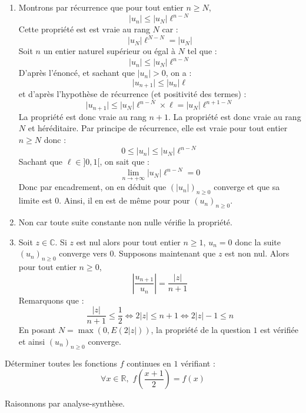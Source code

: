 \documentclass[a4paper,10pt]{report}
\begin{document}
\corr 

\begin{enumerate}
\item Montrons par récurrence que pour tout entier $n \geq N$,
$$ \vert u_n \vert  \leq \vert u_N \vert  \ell^{n-N}$$
Cette propriété est est vraie au rang $N$ car :
$$ \vert u_N \vert \ell^{N-N} = \vert u_N \vert $$
Soit $n$ un entier naturel supérieur ou égal à $N$ tel que :
$$  \vert u_n \vert \leq \vert u_N \vert \ell^{n-N}$$
D'après l'énoncé, et sachant que $\vert u_n \vert >0$, on a :
$$ \vert u_{n+1} \vert \leq \vert u_n \vert \ell$$
et d'après l'hypothèse de récurrence (et positivité des termes) : 
$$  \vert u_{n+1} \vert \leq \vert u_N \vert \ell^{n-N} \times \ell = \vert u_N \vert \ell^{n+1-N}$$
La propriété est donc vraie au rang $n+1$. La propriété est donc vraie au rang $N$ et héréditaire. Par principe de récurrence, elle est vraie pour tout entier $n \geq N$ donc :
$$ 0 \leq \vert u_n \vert \leq  \vert u_N \vert  \ell^{n-N}$$
Sachant que $\ell \in ]0,1[$, on sait que :
$$ \lim_{n \rightarrow + \infty} \vert u_N \vert  \ell^{n-N} = 0$$
Donc par encadrement, on en déduit que $(\vert u_n \vert)_{n \geq 0}$ converge et que sa limite est $0$. Ainsi, il en est de même pour pour $(u_n)_{n \geq 0}$.
\item Non car toute suite constante non nulle vérifie la propriété.
\item Soit $z \in \mathbb{C}$. Si $z$ est nul alors pour tout entier $n \geq 1$, $u_n=0$ donc la suite $(u_n)_{n \geq 0}$ converge vers $0$. Supposons maintenant que $z$ est non nul. Alors pour tout entier $n \geq 0$,
$$ \left\vert \dfrac{u_{n+1}}{u_n} \right\vert =\dfrac{\vert z \vert}{n+1}$$
Remarquons que :
$$ \dfrac{\vert z \vert}{n+1} \leq \dfrac{1}{2} \Longleftrightarrow  2 \vert z \vert \leq n+1 \Longleftrightarrow 2 \vert z \vert - 1 \leq n$$
En posant $N = \max(0, E(2 \vert z\vert))$, la propriété de la question $1$ est vérifiée et ainsi $(u_n)_{n \geq 0}$ converge.
\end{enumerate}

\medskip

\begin{Exa} Déterminer toutes les fonctions $f$ continues en $1$ vérifiant :
$$ \forall x \in \mathbb{R}, \, \, f \left( \frac{x+1}{2} \right) =f(x)$$
\end{Exa}

\corr Raisonnons par analyse-synthèse.

\medskip
\end{document}
